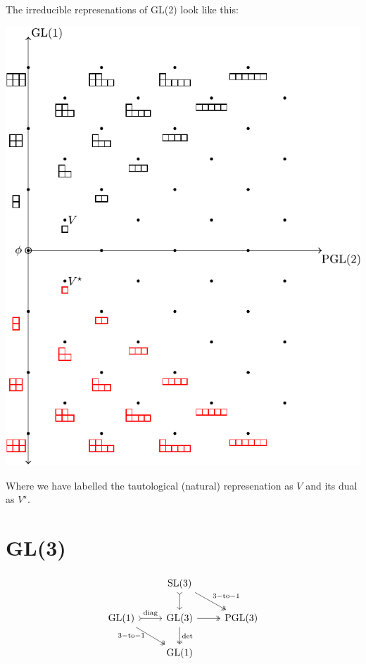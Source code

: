 \documentclass[11pt,oneside]{article}
\newcommand{\GL}{\mathrm{GL}}
\newcommand{\SL}{\mathrm{SL}}
\newcommand{\PGL}{\mathrm{PGL}}
\begin{document}
The irreducible represenations of GL(2) look like this:
\begin{center}
\includegraphics[scale=0.8]{images/gl2.pdf}
\end{center}
Where we have labelled the tautological (natural) represenation as $V$
and its dual as $V^{\star}.$

\section*{GL(3)}

\[
\begin{tikzcd}
    &  
    \SL(3) \arrow[rightarrowtail]{d}\arrow[two heads]{dr}{\mathrm{3-to-1}} &  \\
    \GL(1) \arrow[rightarrowtail]{r}{\mathrm{diag}} 
           \arrow[two heads]{dr}[below,left]{\mathrm{3-to-1\ }}  &  
    \GL(3) \arrow[two heads]{r}\arrow[two heads]{d}{\mathrm{det}}  &  \PGL(3)     \\
    &  \GL(1)             &     \\
\end{tikzcd}
\]
\end{document}
